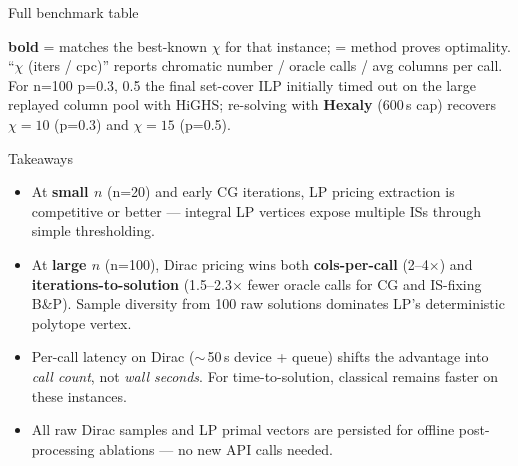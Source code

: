 \documentclass[aspectratio=169,11pt]{beamer}
\newcommand{\cmark}{\textcolor{qcigreen}{\checkmark}}
\newcommand{\bestval}[1]{\textbf{\textcolor{qciteal}{#1}}}
\newcommand{\lpname}{\textcolor{qciblue}{LP pricing}}
\newcommand{\diracname}{\textcolor{qciorange}{Dirac pricing}}
\begin{document}
\begin{frame}{Full benchmark table}
  \vspace{-0.2em}
  \scriptsize
  
  \vspace{0.4em}

  \scriptsize
  \bestval{bold} = matches the best-known $\chi$ for that instance;
  \cmark = method proves optimality.
  ``$\chi$ (iters / cpc)'' reports chromatic number / oracle calls / avg columns per call.
  For n=100 p=0.3, 0.5 the final set-cover ILP initially timed out on the
  large replayed column pool with HiGHS; re-solving with \textbf{Hexaly}
  (600\,s cap) recovers \textbf{$\chi=10$} (p=0.3) and \textbf{$\chi=15$}
  (p=0.5).
\end{frame}

\begin{frame}{Takeaways}
  \begin{itemize}
    \item At \textbf{small $n$} (n=20) and early CG iterations, \lpname{}
          extraction is competitive or better --- integral LP vertices
          expose multiple ISs through simple thresholding.
    \item At \textbf{large $n$} (n=100), \diracname{} wins both
          \bestval{cols-per-call} (2--4$\times$) and
          \bestval{iterations-to-solution} (1.5--2.3$\times$ fewer
          oracle calls for CG and IS-fixing B\&P). Sample diversity from
          100 raw solutions dominates LP's deterministic polytope vertex.
    \item \textcolor{qciorange}{Per-call latency} on Dirac
          ($\sim$\,50\,s device + queue) shifts the advantage into
          \emph{call count}, not \emph{wall seconds}. For time-to-solution,
          classical remains faster on these instances.
    \item All raw Dirac samples and LP primal vectors are persisted for
          offline post-processing ablations --- no new API calls needed.
  \end{itemize}
\end{frame}
\end{document}
